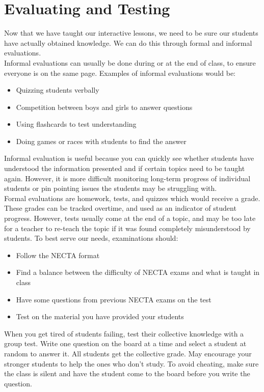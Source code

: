\chapter{Evaluating and Testing}
Now that we have taught our interactive lessons, we need to be sure our students have actually obtained knowledge.  We can do this through formal and informal evaluations.\\
  
Informal evaluations can usually be done during or at the end of class, to ensure everyone is on the same page.  Examples of informal evaluations would be:

\begin{itemize}
 \item Quizzing students verbally
 \item Competition between boys and girls to answer questions
 \item Using flashcards to test understanding
 \item Doing games or races with students to find the answer
\end{itemize}

Informal evaluation is useful because you can quickly see whether students have understood the information presented and if certain topics need to be taught again.  However, it is more difficult monitoring long-term progress of individual students or pin pointing issues the students may be struggling with.\\

Formal evaluations are homework, tests, and quizzes which would receive a grade.  These grades can be tracked overtime, and used as an indicator of student progress.  However, tests usually come at the end of a topic, and may be too late for a teacher to re-teach the topic if it was found completely misunderstood by students. To best serve our needs, examinations should:

\begin{itemize}
 \item Follow the NECTA format
 \item Find a balance between the difficulty of NECTA exams and what is taught in class
 \item Have some questions from previous NECTA  exams on the test
 \item Test on the material you have provided your students
\end{itemize}

When you get tired of students failing, test their collective knowledge with a group test.  Write one question on the board at a time and select a student at random to answer it.  All students get the collective grade.  May encourage your stronger students to help the ones who don't study.  To avoid cheating, make sure the class is silent and have the student come to the board before you write the question.


